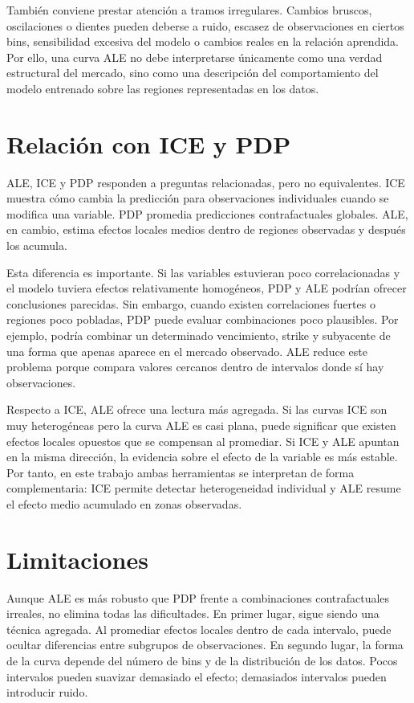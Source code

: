 También conviene prestar atención a tramos irregulares. Cambios bruscos, oscilaciones o dientes pueden deberse a ruido, escasez de observaciones en ciertos bins, sensibilidad excesiva del modelo o cambios reales en la relación aprendida. Por ello, una curva ALE no debe interpretarse únicamente como una verdad estructural del mercado, sino como una descripción del comportamiento del modelo entrenado sobre las regiones representadas en los datos.

\section*{Relación con ICE y PDP}

ALE, ICE y PDP responden a preguntas relacionadas, pero no equivalentes. ICE muestra cómo cambia la predicción para observaciones individuales cuando se modifica una variable. PDP promedia predicciones contrafactuales globales. ALE, en cambio, estima efectos locales medios dentro de regiones observadas y después los acumula.

Esta diferencia es importante. Si las variables estuvieran poco correlacionadas y el modelo tuviera efectos relativamente homogéneos, PDP y ALE podrían ofrecer conclusiones parecidas. Sin embargo, cuando existen correlaciones fuertes o regiones poco pobladas, PDP puede evaluar combinaciones poco plausibles. Por ejemplo, podría combinar un determinado vencimiento, strike y subyacente de una forma que apenas aparece en el mercado observado. ALE reduce este problema porque compara valores cercanos dentro de intervalos donde sí hay observaciones.

Respecto a ICE, ALE ofrece una lectura más agregada. Si las curvas ICE son muy heterogéneas pero la curva ALE es casi plana, puede significar que existen efectos locales opuestos que se compensan al promediar. Si ICE y ALE apuntan en la misma dirección, la evidencia sobre el efecto de la variable es más estable. Por tanto, en este trabajo ambas herramientas se interpretan de forma complementaria: ICE permite detectar heterogeneidad individual y ALE resume el efecto medio acumulado en zonas observadas.

\section*{Limitaciones}

Aunque ALE es más robusto que PDP frente a combinaciones contrafactuales irreales, no elimina todas las dificultades. En primer lugar, sigue siendo una técnica agregada. Al promediar efectos locales dentro de cada intervalo, puede ocultar diferencias entre subgrupos de observaciones. En segundo lugar, la forma de la curva depende del número de bins y de la distribución de los datos. Pocos intervalos pueden suavizar demasiado el efecto; demasiados intervalos pueden introducir ruido.

